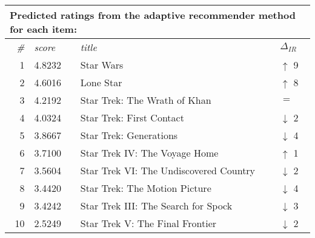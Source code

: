 \begin{table}[h]
  \begin{tabular*}{0.9\textwidth}{ r l p{8.5cm} l }
    \multicolumn{4}{l}{Predicted ratings from the adaptive recommender method for each item:}\\
    \toprule
    \emph{\#} & \emph{score} & \emph{title} & $\Delta_{IR}$\\
    \midrule
    1 & 4.8232 & Star Wars                              & \color{green} $\uparrow$ 9 \\
    2 & 4.6016 & Lone Star                              & \color{green} $\uparrow$ 8 \\
    3 & 4.2192 & Star Trek: The Wrath of Khan           & \color{black} $=$ \\
    4 & 4.0324 & Star Trek: First Contact               & \color{red} $\downarrow$ 2 \\
    5 & 3.8667 & Star Trek: Generations                 & \color{red} $\downarrow$ 4 \\
    6 & 3.7100 & Star Trek IV: The Voyage Home          & \color{green} $\uparrow$ 1 \\
    7 & 3.5604 & Star Trek VI: The Undiscovered Country & \color{red} $\downarrow$ 2 \\
    8 & 3.4420 & Star Trek: The Motion Picture          & \color{red} $\downarrow$ 4 \\
    9 & 3.4242 & Star Trek III: The Search for Spock    & \color{red} $\downarrow$ 3 \\
    10& 2.5249 & Star Trek V: The Final Frontier        & \color{red} $\downarrow$ 2 \\
    \bottomrule
  \end{tabular*}

  \vspace{1em} 


\end{table}
